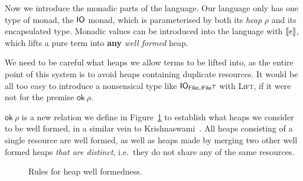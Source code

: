 Now we introduce the monadic parts of the language. Our language only
has one type of monad, the $\IO$ monad, which is parameterised by both
its \emph{heap} $\rho$ and its encapsulated type. Monadic values can be
introduced into the language with $\lift{e}$, which lifts a pure term into
\textbf{any} \emph{well formed} heap. 
\begin{mathpar}
\end{mathpar}
We need to be careful what heaps we allow terms to be lifted into, as
the entire point of this system is to avoid heaps containing duplicate
resources. It would be all too easy to introduce a nonsensical type
like $\IO_{\textsf{File} \cup \textsf{File}} \tau$ with \textsc{Lift}, if it
were not for the premise $\textsf{ok} \ \rho$.

$\textsf{ok} \ \rho$ is a new relation we define in
Figure~\ref{fig:heapwellformedness} to establish what heaps we
consider to be well formed, in a similar vein to
Krishnaswami~\cite{krishnaswami2006}. All heaps consisting of a single
resource are well formed, as well as heaps made by merging two other
well formed heaps \textit{that are distinct}, i.e.\ they do not share
any of the same resources.
\begin{figure}
  \centering
  \caption{Rules for heap well formedness.}\label{fig:heapwellformedness}
\end{figure}

